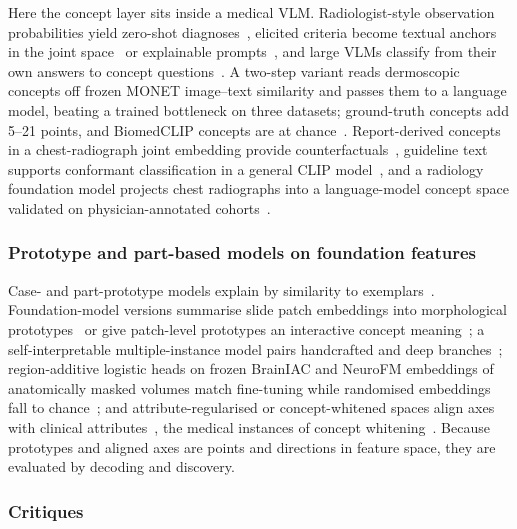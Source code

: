 Here the concept layer
sits inside a medical VLM. Radiologist-style observation probabilities yield zero-shot
diagnoses~\cite{pellegrini2023xplainer}, elicited criteria become textual anchors in the joint
space~\cite{gao2024aligning} or explainable prompts~\cite{bie2024xcoop}, and large VLMs classify from
their own answers to concept questions~\cite{patricio2025cbvlm}. A two-step variant reads dermoscopic
concepts off frozen MONET image--text similarity and passes them to a language model, beating a trained
bottleneck on three datasets; ground-truth concepts add 5--21 points, and BiomedCLIP concepts are at
chance~\cite{patricio2025twostep}. Report-derived concepts in a chest-radiograph joint embedding provide
counterfactuals~\cite{sadashivaiah2024explaining}, guideline text supports conformant classification in
a general CLIP model~\cite{harmanani2026vision}, and a radiology foundation model projects chest
radiographs into a language-model concept space validated on physician-annotated
cohorts~\cite{han2026clear}.

\subsubsection{Prototype and part-based models on foundation features}

Case- and part-prototype models explain
by similarity to exemplars~\cite{chen2019thislooks,barnett2021case,kim2021xprotonet}. Foundation-model
versions summarise slide patch embeddings into morphological prototypes~\cite{song2024morphological} or
give patch-level prototypes an interactive concept meaning~\cite{huy2025interactive}; a
self-interpretable multiple-instance model pairs handcrafted and deep branches~\cite{kapse2023si};
region-additive logistic heads on frozen BrainIAC and NeuroFM embeddings of anatomically masked
volumes match fine-tuning while randomised embeddings fall to chance~\cite{zhang2026regionfm}; and
attribute-regularised or concept-whitened spaces align axes with clinical
attributes~\cite{cetin2022attri,hou2024concept}, the medical instances of concept
whitening~\cite{chen2020concept}. Because prototypes and aligned axes are points and directions in
feature space, they are evaluated by decoding and discovery.

\subsubsection{Critiques}

